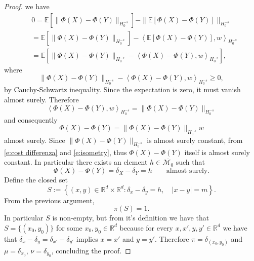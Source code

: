 \documentclass[12pt,a4paper,oneside]{amsart}
\theoremstyle{plain}
\theoremstyle{definition}
\numberwithin{equation}{section}
\numberwithin{figure}{section}
\numberwithin{table}{section}
\theoremstyle{remark}
\newcommand{\R}{\mathbb{R}}
\begin{document}
\begin{proof}
we have
\begin{align*}
& 0=\mathbb E[\|\Phi(X)-\Phi(Y)\|_{H_0^{-s}}]-
\|\mathbb E[\Phi(X)-\Phi(Y)]\|_{H_0^{-s}} \\ & =\mathbb E[\|\Phi(X)-\Phi(Y)\|_{H_0^{-s}}]
-\left\langle \mathbb E[\Phi(X)-\Phi(Y)],w\right\rangle_{H_0^{-s}} \\ &=\mathbb E[
\|\Phi(X)-\Phi(Y)\|_{H_0^{-s}}
-\left\langle \Phi(X)-\Phi(Y),w\right\rangle_{H_0^{-s}}
],
\end{align*}
where 
\begin{equation*}
\|\Phi(X)-\Phi(Y)\|_{H_0^{-s}}
-
\left\langle \Phi(X)-\Phi(Y),w\right\rangle_{H_0^{-s}}\geq 0,    
\end{equation*}
by Cauchy-Schwartz inequality. Since the expectation is zero, it must vanish almost surely.
Therefore
\begin{equation*}
\left\langle \Phi(X)-\Phi(Y),w\right\rangle_{H_0^{-s}}
=
\|\Phi(X)-\Phi(Y)\|_{H_0^{-s}}
\end{equation*}
and consequently
\begin{equation*}
\Phi(X)-\Phi(Y)=\|\Phi(X)-\Phi(Y)\|_{H_0^{-s}}w
\end{equation*}
almost surely. 
Since $\|\Phi(X)-\Phi(Y)\|_{H_0^{-s}}$ is almost surely constant, from \eqref{e:cost differenza} and \eqref{e:isometry}, thus $\Phi(X)-\Phi(Y)$ itself is
almost surely constant. In particular there exists an element $h\in \overline{\mathcal{M}_0}$ such that
\begin{equation*}
\Phi(X)-\Phi(Y)=\delta_X-\delta_Y=h
\qquad\text{almost surely.}    
\end{equation*}
Define the closed set
\begin{equation*}
   S:=
\left\{
(x,y)\in \R^d\times\R^d:
\delta_x-\delta_y=h,
\quad
|x-y|=m
\right\}. 
\end{equation*}
From the previous argument,
\begin{equation*}
\pi(S)=1.    
\end{equation*}
In particular $S$ is non-empty, but from it's definition we have that $S=\{(x_0,y_0)\}$ for some $x_0,y_0\in \R^d$ because for every $x,x',y,y' \in \R^d$ we have that $\delta_x-\delta_y=\delta_{x'}-\delta_{y'}$ implies $x=x'$ and $y=y'$. Therefore $\pi=\delta_{(x_0,y_0)}$ and $\mu=\delta_{x_0}$, $\nu=\delta_{y_0}$, concluding the proof.
\end{proof}
\end{document}
